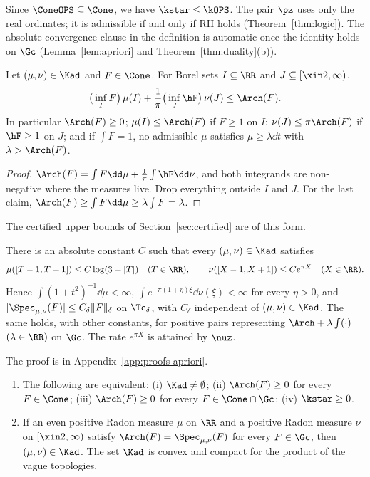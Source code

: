 Since $\ConeOPS\subseteq\Cone$, we have $\kstar\le\kOPS$. The pair $\pz$ uses only the real ordinates; it is admissible
if and only if RH holds (Theorem~\ref{thm:logic}). The absolute-convergence clause in the definition is automatic once the
identity holds on $\Gc$ (Lemma~\ref{lem:apriori} and Theorem~\ref{thm:duality}(b)).

\begin{lemma}\label{lem:weak-duality}
Let $(\mu,\nu)\in\Kad$ and $F\in\Cone$. For Borel sets $I\subseteq\RR$ and $J\subseteq[\xin2,\infty)$,
\[
\big(\inf_I F\big)\,\mu(I)+\frac1\pi\big(\inf_J\hF\big)\,\nu(J)\le\Arch(F).
\]
In particular $\Arch(F)\ge0$; $\mu(I)\le\Arch(F)$ if $F\ge1$ on $I$; $\nu(J)\le\pi\Arch(F)$ if $\hF\ge1$ on $J$; and if
$\int F=1$, no admissible $\mu$ satisfies $\mu\ge\lambda\dd t$ with $\lambda>\Arch(F)$.
\end{lemma}

\begin{proof}
$\Arch(F)=\int F\dd\mu+\frac1\pi\int\hF\dd\nu$, and both integrands are non-negative where the measures live. Drop
everything outside $I$ and $J$. For the last claim, $\Arch(F)\ge\int F\dd\mu\ge\lambda\int F=\lambda$.
\end{proof}

The certified upper bounds of Section~\ref{sec:certified} are of this form.

\begin{lemma}\label{lem:apriori}
There is an absolute constant $C$ such that every $(\mu,\nu)\in\Kad$ satisfies
\[
\mu([T-1,T+1])\le C\log(3+|T|)\quad(T\in\RR),\qquad \nu([X-1,X+1])\le Ce^{\pi X}\quad(X\in\RR).
\]
Hence $\int(1+t^2)^{-1}\dd\mu<\infty$, $\int e^{-\pi(1+\eta)\xi}\dd\nu(\xi)<\infty$ for every $\eta>0$, and
$|\Spec_{\mu,\nu}(F)|\le C_\delta\|F\|_\delta$ on $\Tc_\delta$, with $C_\delta$ independent of $(\mu,\nu)\in\Kad$.
The same holds, with other constants, for positive pairs representing $\Arch+\lambda\int(\cdot)$ $(\lambda\in\RR)$ on
$\Gc$. The rate $e^{\pi X}$ is attained by $\nuz$.
\end{lemma}

The proof is in Appendix~\ref{app:proofs-apriori}.

\begin{theorem}[Duality]\label{thm:duality}
\begin{enumerate}[label=\textup{(\alph*)}]
\item The following are equivalent: \textup{(i)} $\Kad\ne\emptyset$; \textup{(ii)} $\Arch(F)\ge0$ for every $F\in\Cone$;
\textup{(iii)} $\Arch(F)\ge0$ for every $F\in\Cone\cap\Gc$; \textup{(iv)} $\kstar\ge0$.
\item If an even positive Radon measure $\mu$ on $\RR$ and a positive Radon measure $\nu$ on $[\xin2,\infty)$ satisfy
$\Arch(F)=\Spec_{\mu,\nu}(F)$ for every $F\in\Gc$, then $(\mu,\nu)\in\Kad$. The set $\Kad$ is convex and compact for the
product of the vague topologies.
\end{enumerate}
\end{theorem}

